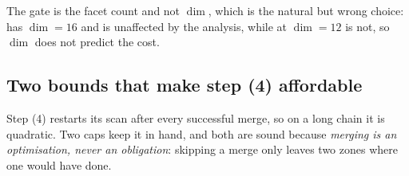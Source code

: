 The gate is the facet count and not $\dim$, which is the natural but wrong
choice:  has $\dim = 16$ and is unaffected by the analysis, while
 at $\dim = 12$ is not, so $\dim$ does not predict the cost.

\FigHull

\subsection{Two bounds that make step (4) affordable}

Step (4) restarts its scan after every successful merge, so on a long chain it
is quadratic.  Two caps keep it in hand, and both are sound because
\emph{merging is an optimisation, never an obligation}: skipping a merge only
leaves two zones where one would have done.

